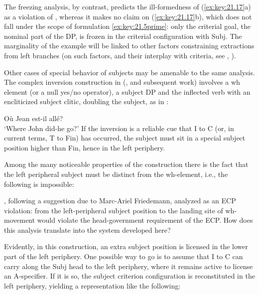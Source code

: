 \documentclass[output=paper]{langsci/langscibook}
\begin{document}
\begin{exe}
The freezing analysis, by contrast, predicts the ill-formedness of
(\ref{ex:key:21.17}a) as a violation of , whereas it
makes no claim on (\ref{ex:key:21.17}b), which does not fall under the scope of
formulation  \eqref{ex:key:21.5prime}: only the criterial goal, the nominal
part of the DP, is frozen in the criterial configuration with Subj\tss{[+N]}.
The marginality of the example will be linked to other factors constraining
extractions from left branches (on such factors, and their interplay with
criteria, see \citealt{Lohndal2010}, \citealt{Berthelot2017}).

Other cases of special behavior of subjects may be amenable to the same
analysis. The complex inversion construction in 
(\citealt{Kayne1972,RizziRoberts1989}, and subsequent work) involves a wh
element (or a null yes/no operator), a subject DP and the inflected verb with
an encliticized subject clitic, doubling the subject, as in :

\ea%
    \label{ex:key:21.18}
    \sn Où        Jean est-il allé?\\
         ‘Where John did-he go?’
\z
%
If the inversion is a reliable cue that I to C (or, in current terms, T to Fin)
has occurred, the subject must sit in a special subject position higher than
Fin, hence in the left periphery.

Among the many noticeable properties of the construction there is the fact that
the left peripheral subject must be distinct from the wh-element, i.e., the
following is impossible:

\ea%
    \label{ex:key:21.19}
\z
%
\textcite{RizziRoberts1989}, following a suggestion due to Marc-Ariel
Friedemann, analyzed  as an \gls{ECP} violation:  from the left-peripheral subject position to the
landing site of wh-movement would violate the head-government requirement of
the \gls{ECP}. How does this analysis translate into the system developed here?

Evidently, in this construction, an extra subject position is licensed in the
lower part of the left periphery. One possible way to go is to assume that I to
C can carry along the Subj head to the left periphery, where it remains active
to license an A-specifier. If it is so, the subject criterion configuration is
reconstituted in the left periphery, yielding a representation like the
following:


\end{exe}
\end{document}
